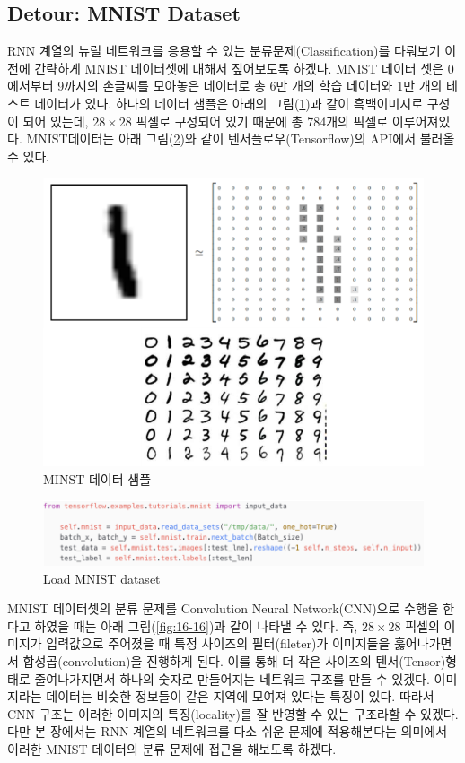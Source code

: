 \documentclass[draft=false]{oblivoir}
\begin{document}
\subsection{Detour: MNIST Dataset}
RNN 계열의 뉴럴 네트워크를 응용할 수 있는 분류문제(Classification)를 다뤄보기 이전에 간략하게 MNIST 데이터셋에 대해서 짚어보도록 하겠다. MNIST 데이터 셋은 0에서부터 9까지의 손글씨를 모아놓은 데이터로 총 6만 개의 학습 데이터와 1만 개의 테스트 데이터가 있다. 하나의 데이터 샘플은 아래의 그림(\ref{fig:16-14})과 같이 흑백이미지로 구성이 되어 있는데, $28 \times 28$ 픽셀로 구성되어 있기 때문에 총 784개의 픽셀로 이루어져있다. MNIST데이터는 아래 그림(\ref{fig:16-15})와 같이 텐서플로우(Tensorflow)의 API에서 불러올 수 있다.

\begin{figure}[ht] \centering 
  \includegraphics[scale=0.2]{fig14.png}
  \caption{MINST 데이터 샘플}
  \label{fig:16-14}
\end{figure}

\begin{figure}[ht] \centering 
  \includegraphics[scale=1.0]{fig15.png}
  \caption{Load MNIST dataset}
  \label{fig:16-15}
\end{figure}

MNIST 데이터셋의 분류 문제를 Convolution Neural Network(CNN)으로 수행을 한다고 하였을 때는 아래 그림(\ref{fig:16-16})과 같이 나타낼 수 있다. 즉, $28 \times 28$ 픽셀의 이미지가 입력값으로 주어졌을 때 특정 사이즈의 필터(fileter)가 이미지들을 훓어나가면서 합성곱(convolution)을 진행하게 된다. 이를 통해 더 작은 사이즈의 텐서(Tensor)형태로 줄여나가지면서 하나의 숫자로 만들어지는 네트워크 구조를 만들 수 있겠다. 이미지라는 데이터는 비슷한 정보들이 같은 지역에 모여져 있다는 특징이 있다. 따라서 CNN 구조는 이러한 이미지의 특징(locality)를 잘 반영할 수 있는 구조라할 수 있겠다. 다만 본 장에서는 RNN 계열의 네트워크를 다소 쉬운 문제에 적용해본다는 의미에서 이러한 MNIST 데이터의 분류 문제에 접근을 해보도록 하겠다.
\end{document}
